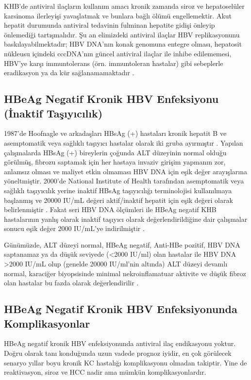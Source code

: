 KHB'de antiviral ilaçların kullanım amacı kronik zamanda siroz ve hepatoselüler karsinoma ilerleyişi yavaşlatmak ve bunlara bağlı ölümü engellemektir. Akut hepatit durumunda antiviral tedavinin fulminan hepatite gidişi önleyip önlemediği tartışmalıdır. Şu an elimizdeki antiviral ilaçlar HBV replikasyonunu baskılayabilmektadır; HBV DNA'nın konak genomuna entegre olması, hepatosit nükleusu içindeki cccDNA'nın güncel antiviral ilaçlar ile inhibe edilememesi, HBV'ye karşı immuntolerans (örn. immuntoleran hastalar) gibi sebeplerle eradikasyon ya da kür sağlanamamaktadır  \cite{locarnini2015strategies}.


\subsection{HBeAg Negatif Kronik HBV Enfeksiyonu (İnaktif Taşıyıcılık)}

1987'de Hoofnagle ve arkadaşları HBsAg (+) hastaları kronik hepatit B ve asemptomatik veya sağlıklı taşıyıcı hastalar olarak iki gruba ayırmıştır \cite{hoofnagle1987chronic}. Yapılan çalışmalarda HBsAg (+) bireylerin çoğunda ALT düzeyinin normal olduğu görülmüş, fibrozu saptamak için her hastaya invaziv girişim yapmanın zor, anlamsız olması ve maliyet etkin olmaması HBV DNA için eşik değer arayışlarına yöneltmiştir. 2000'de National Institute of Health tarafından asemptomatik veya sağlıklı taşıyıcılık yerine inaktif HBsAg taşıyıcılığı terminolojisi kullanılmaya başlanmış ve 20000 IU/mL değeri aktif/inaktif hepatit için eşik değeri olarak belirlenmiştir \cite{lok2001management}. Fakat seri HBV DNA ölçümleri ile HBeAg negatif KHB hastalarının yanlış olarak inaktif taşıyıcı olarak değerlendirildiğine dair çalışmalar sonucu eşik değer 2000 IU/mL'ye indirilmiştir \cite{chu2002quantitative,cacciola2005virological}.


Günümüzde, ALT düzeyi normal, HBeAg negatif, Anti-HBe pozitif, HBV DNA saptanamaz ya da düşük seviyede (<2000 IU/ml) olan hastalar ile HBV DNA >2000 IU/mL olup  (genelde 20000 IU/ml'nin altında) ALT düzeyi devamlı normal, karaciğer biyopsisinde minimal nekroinflamatuar aktivite ve düşük fibroz olan hastalar bu fazda olarak değerlendirilir \cite{european2017easl,terrault2016aasld,sarin2016asian}. 


\subsection{HBeAg Negatif Kronik HBV Enfeksiyonunda Komplikasyonlar}

HBeAg negatif kronik HBV enfeksiyonunda antiviral ilaç endikasyonu yoktur. Doğru olarak tanı konduğunda uzun vadede prognoz iyidir, en çok görülecek senaryo yıllar boyu kronik KC hastalığı komplikasyonu olmadan takiptir. Yine de reaktivasyon, siroz ve HCC nadir ama mümkün komplikasyonlardır.    


